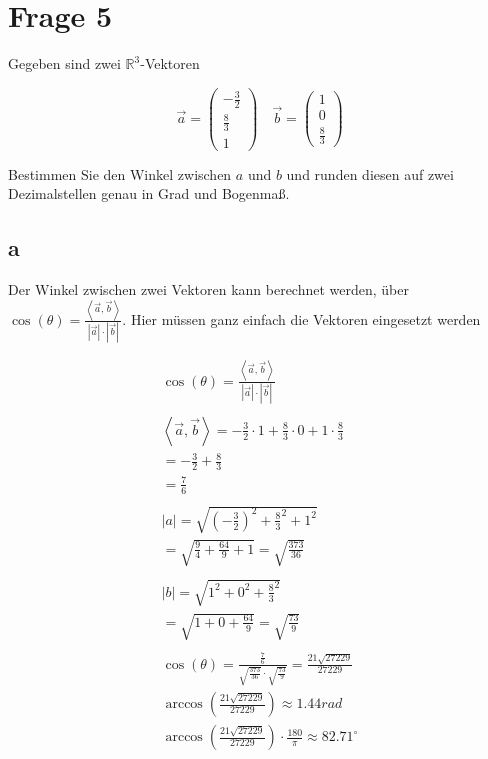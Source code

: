 \section{Frage 5}

Gegeben sind zwei $\mathbb{R}^3$-Vektoren

\[
\vec{a} = \begin{pmatrix}
    -\frac{3}{2} \\
    \frac{8}{3} \\
    1
\end{pmatrix} \quad \vec{b} = \begin{pmatrix}
    1 \\ 0 \\ \frac{8}{3}
\end{pmatrix}
\]

Bestimmen Sie den Winkel zwischen $a$ und $b$ und runden diesen auf zwei Dezimalstellen genau in Grad und Bogenmaß.

\subsection{a}

Der Winkel zwischen zwei Vektoren kann berechnet werden, über $\cos(\theta) = \frac{\left\langle \vec{a}, \vec{b} \right\rangle}{\left|\vec{a}\right| \cdot \left|\vec{b}\right|}$. Hier müssen ganz einfach die Vektoren eingesetzt werden

\begin{align*}
    \cos(\theta) = \frac{\left\langle \vec{a}, \vec{b} \right\rangle}{\left|\vec{a}\right| \cdot \left|\vec{b}\right|} \\\\
    \left\langle \vec{a}, \vec{b} \right\rangle = -\frac{3}{2} \cdot 1 + \frac{8}{3} \cdot 0 + 1 \cdot \frac{8}{3} \\
    = -\frac{3}{2} + \frac{8}{3} \\
    = \frac{7}{6} \\\\
    \left|a\right| = \sqrt{{(-\frac{3}{2})}^2 + \frac{8}{3}^2 + 1^2} \\
    = \sqrt{{\frac{9}{4}} + \frac{64}{9} + 1}
    = \sqrt{\frac{373}{36}} \\\\
    \left|b\right| = \sqrt{1^2 + 0^2 + \frac{8}{3}^2} \\
    = \sqrt{1 + 0 + \frac{64}{9}}
    = \sqrt{\frac{73}{9}} \\\\
    \cos(\theta) = \frac{\frac{7}{6}}{\sqrt{\frac{373}{36}} \cdot \sqrt{\frac{73}{9}}} = \frac{21 \sqrt{27229}}{27229} \\
    \arccos\left(\frac{21 \sqrt{27229}}{27229}\right) \approx 1.44 rad \\
    \arccos\left(\frac{21 \sqrt{27229}}{27229}\right) \cdot \frac{180}{\pi} \approx 82.71^\circ
\end{align*}

